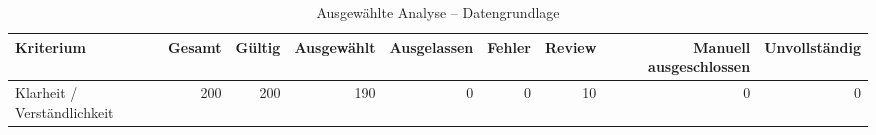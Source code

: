 \begin{table}[htbp]
\centering
\caption{Ausgewählte Analyse -- Datengrundlage}
\begin{tabular}{lrrrrrrrr}
\toprule
Kriterium & Gesamt & Gültig & Ausgewählt & Ausgelassen & Fehler & Review & Manuell ausgeschlossen & Unvollständig \\
\midrule
Klarheit / Verständlichkeit & 200 & 200 & 190 & 0 & 0 & 10 & 0 & 0 \\
\bottomrule
\end{tabular}
\end{table}
